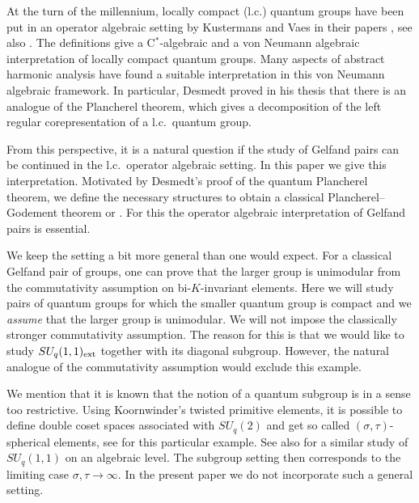 \documentclass[pdftex]{sigma}
\numberwithin{equation}{section}
\theoremstyle{definition}
\begin{document}
At the turn of the millennium, locally compact (l.c.) quantum groups have been put in an operator algebraic setting by
Kustermans and Vaes in their papers \cite{KusVae, KusVaeII},
see also \cite{KusLec, Tim, DaeleLcqg}. The def\/initions give a C$^\ast$-algebraic and a von Neumann algebraic interpretation of locally compact quantum groups. Many aspects of abstract harmonic analysis have found a suitable interpretation in this von Neumann algebraic framework.  In particular, Desmedt proved in his thesis \cite{Des} that there is an analogue of the Plancherel theorem, which gives a decomposition of the left regular corepresentation of a l.c.\ quantum group.



From this perspective, it is a natural question if the study of Gelfand pairs can be continued in the l.c.\ operator algebraic setting. In this paper we give this interpretation. Motivated by Desmedt's proof of the quantum Plancherel theorem, we def\/ine the necessary structures to obtain a classical Plancherel--Godement theorem \cite[Theorem 6.4.5]{Dij} or \cite[Th\'eor\`eme IV.2]{Far}. For this the operator algebraic interpretation of Gelfand pairs is essential.

We keep the setting a bit more general than one would expect. For a classical Gelfand pair of groups, one can prove that the larger group is unimodular from the commutativity assumption on bi-$K$-invariant elements. Here we will study pairs of quantum groups for which the smaller quantum group is compact and we {\it assume} that the larger group is unimodular. We will not impose the classically stronger commutativity assumption. The reason for this is that we would like to study $SU_q(1,1)_{\rm ext}$ together with its diagonal subgroup. However, the natural analogue of the commutativity assumption would exclude this example.

We mention that it is known that the notion of a quantum subgroup is in a sense too restrictive. Using Koornwinder's twisted primitive elements, it is possible to def\/ine double coset spaces associated with $SU_q(2)$ and get so called $(\sigma, \tau)$-spherical elements, see \cite{KoeAsk} for this particular example. See also \cite{KoeSto} for a similar study of $SU_q(1,1)$ on an algebraic level. The subgroup setting then corresponds to the limiting case $\sigma, \tau \rightarrow \infty$. In the present paper we do not incorporate such a general setting.
\end{document}

